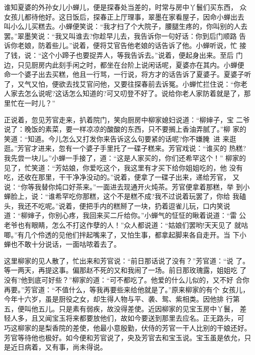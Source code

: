 谁知夏婆的外孙女儿小蝉儿，便是探春处当差的，时常与房中丫鬟们买东西，
众女孩儿都待他好。这日饭后，探春正上厅理事，翠墨在家看屋子，因命小蝉出去
叫小么儿买糕去。小蝉便笑说：“我才扫了个大院子，腰腿生疼的，你叫别的人去
罢。”翠墨笑说：“我又叫谁去?你趁早儿去，我告诉你一句好话：你到后门顺路
告诉你老娘，防着些儿。”说着，便将艾官告他老娘的话告诉了他。小蝉听说，忙
接了钱，说：“这个小蹄子也要捉弄人，等我告诉去。”说着，便起身出来。至后
门边，只见厨房内此刻手闲之时，都坐在台阶上说闲话呢，夏婆亦在其内。小蝉便
命一个婆子出去买糕，他且一行骂，一行说，将方才的话告诉了夏婆子。夏婆子听
了，又气又怕，便欲去找艾官问他，又要往探春前去诉冤。小蝉忙拦住说：“你老
人家去怎么说呢?这话怎么知道的?可又叨登不好了。说给你老人家防着就是了，那
里忙在一时儿？”

正说着，忽见芳官走来，扒着院门，笑向厨房中柳家媳妇说道：“柳婶子，宝
二爷说了：晚饭的素菜，要一样凉凉的酸酸的东西，只不要搁上香油弄腻了。”柳
家的笑道：“知道。今儿怎么又打发你来告诉这么句要紧的话呢?你不嫌腌，进
来逛逛。”芳官才进来，忽有一个婆子手里托了一碟子糕来。芳官戏说：“谁买的
热糕?我先尝一块儿。”小蝉一手接了，道：“这是人家买的，你们还希罕这个！”
柳家的见了，忙笑道：“芳姑娘，你爱吃这个，我这里有才买下给你姐姐吃的，他
没有吃，还收在那里，干干净净没动的。”说着，便拿了一碟子出来，递给芳官，
又说：“你等我替你炖口好茶来。”一面进去现通开火炖茶。芳官便拿着那糕，举
到小蝉脸上，说：“谁希罕吃你那糕，这个不是糕不成?我不过说着玩罢了，你给
我磕头，我还不吃呢。”说着，便把手内的糕掰了一块，扔着逗雀儿玩，口内笑说
道：“柳婶子，你别心疼，我回来买二斤给你。”小蝉气的怔怔的瞅着说道：“雷
公老爷也有眼睛，怎么不打这作孽的人！”众人都说道：“姑娘们罢哟!天天见了
就咕唧。”有几个伶透的见他们拌起嘴来了，又怕生事，都拿起脚来各自走开。当
下小蝉也不敢十分说话，一面咕哝着去了。

这里柳家的见人散了，忙出来和芳官说：“前日那话说了没有？”芳官道：“说
了。等一两天，再提这事。偏那赵不死的又和我闹了一场。前日那玫瑰露，姐姐吃
了没有?他到底可好些？”柳家的道：“可不都吃了。他爱的什么儿似的，又不好
合你再要。”芳官道：“不值什么，等我再要些来给他就是了。”原来柳家的有个
女孩儿，今年十六岁，虽是厨役之女，却生得人物与平、袭、鸳、紫相类。因他排
行第五，便叫他五儿。只是素有弱疾，故没得差使。近因柳家的见宝玉房中丫鬟，
差轻人多，且又闻宝玉将来都要放他们，故如今要送到那里去应名。正无路头，可
巧这柳家的是梨香院的差使，他最小意殷勤，伏侍的芳官一干人比别的干娘还好。
芳官等待他也极好。如今便和芳官说了，央及芳官去和宝玉说。宝玉虽是依允，只
是近日病着，又有事，尚未得说。

